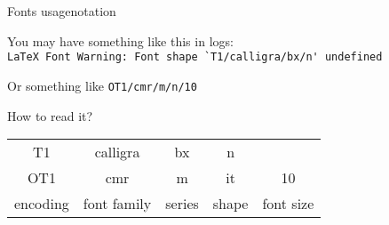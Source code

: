 \begin{frame}[fragile]{Fonts usage\preMagicPage}{notation}\relax

    You may have something like this in logs:\\ 
    {\csk \verb|LaTeX Font Warning: Font shape `T1/calligra/bx/n' undefined|}
    
    Or something like {\csk\verb|OT1/cmr/m/n/10|}
    
    How to read it?
    \strut
    \inpause
    
    \centering 
    \begin{tabular}{c|c|c|c|c}
    T1&calligra&bx&n&\\ 
    OT1&cmr&m&it&10\\\hline
    \large encoding & font family & series & shape & font size
    \end{tabular}
\end{frame}

